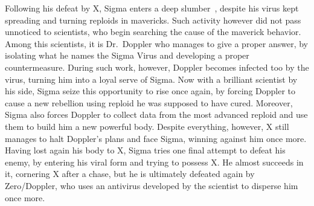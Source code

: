 Following his defeat by X, Sigma enters a deep slumber~\cite{wayback:X3_resources}, despite his virus kept spreading and turning reploids in mavericks. Such activity however did not pass unnoticed to scientists, who begin searching the cause of the maverick behavior. Among this scientists, it is Dr.~Doppler who manages to give a proper answer, by isolating what he names the Sigma Virus and developing a proper countermeasure. During such work, however, Doppler becomes infected too by the virus, turning him into a loyal serve of Sigma. Now with a brilliant scientist by his side, Sigma seize this opportunity to rise once again, by forcing Doppler to cause a new rebellion using reploid he was supposed to have cured. Moreover, Sigma also forces Doppler to collect data from the most advanced reploid and use them to build him a new powerful body. Despite everything, however, X still manages to halt Doppler's plans and face Sigma, winning against him once more. Having lost again his body to X, Sigma tries one final attempt to defeat his enemy, by entering his viral form and trying to possess X. He almost succeeds in it, cornering X after a chase, but he is ultimately defeated again by Zero/Doppler, who uses an antivirus developed by the scientist to disperse him once more.


